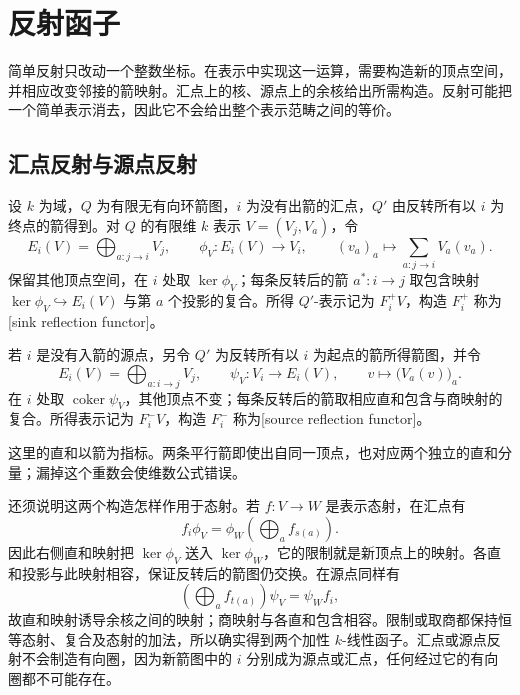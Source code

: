 \section{反射函子}
\label{b5:sec:1002}

简单反射只改动一个整数坐标。在表示中实现这一运算，需要构造新的顶点空间，并相应改变邻接的箭映射。汇点上的核、源点上的余核给出所需构造。反射可能把一个简单表示消去，因此它不会给出整个表示范畴之间的等价。

\subsection{汇点反射与源点反射}
\label{b5:subsec:1002:01}

\begin{definition}\label{b5:def:reflection-functors}
	设 \(k\) 为域，\(Q\) 为有限无有向环箭图，\(i\) 为没有出箭的汇点，\(Q'\) 由反转所有以 \(i\) 为终点的箭得到。对 \(Q\) 的有限维 \(k\) 表示 \(V=(V_j,V_a)\)，令
	\[
		E_i(V)=\bigoplus_{a:j\to i}V_j,\qquad \phi_V:E_i(V)\longrightarrow V_i,\qquad (v_a)_a\longmapsto\sum_{a:j\to i}V_a(v_a).
	\]
	保留其他顶点空间，在 \(i\) 处取 \(\ker\phi_V\)；每条反转后的箭 \(a^*:i\to j\) 取包含映射 \(\ker\phi_V\hookrightarrow E_i(V)\) 与第 \(a\) 个投影的复合。所得 \(Q'\)-表示记为 \(F_i^+V\)，构造 \(F_i^+\) 称为[sink reflection functor]。

	若 \(i\) 是没有入箭的源点，另令 \(Q'\) 为反转所有以 \(i\) 为起点的箭所得箭图，并令
	\[
		E_i(V)=\bigoplus_{a:i\to j}V_j,\qquad \psi_V:V_i\longrightarrow E_i(V),\qquad v\longmapsto\bigl(V_a(v)\bigr)_a.
	\]
	在 \(i\) 处取 \(\operatorname{coker}\psi_V\)，其他顶点不变；每条反转后的箭取相应直和包含与商映射的复合。所得表示记为 \(F_i^-V\)，构造 \(F_i^-\) 称为[source reflection functor]。
\end{definition}

这里的直和以箭为指标。两条平行箭即使出自同一顶点，也对应两个独立的直和分量；漏掉这个重数会使维数公式错误。

\ProseParagraphBreak

还须说明这两个构造怎样作用于态射。若 \(f:V\to W\) 是表示态射，在汇点有
\[
	f_i\phi_V=\phi_W\left(\bigoplus_a f_{s(a)}\right).
\]
因此右侧直和映射把 \(\ker\phi_V\) 送入 \(\ker\phi_W\)，它的限制就是新顶点上的映射。各直和投影与此映射相容，保证反转后的箭图仍交换。在源点同样有
\[
	\left(\bigoplus_a f_{t(a)}\right)\psi_V=\psi_Wf_i,
\]
故直和映射诱导余核之间的映射；商映射与各直和包含相容。限制或取商都保持恒等态射、复合及态射的加法，所以确实得到两个加性 \(k\)-线性函子。汇点或源点反射不会制造有向圈，因为新箭图中的 \(i\) 分别成为源点或汇点，任何经过它的有向圈都不可能存在。

